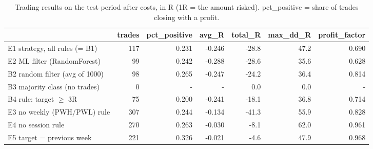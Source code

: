 \begin{table}[h]
\centering
\caption{Trading results on the test period after costs, in R (1R = the amount risked). pct\_positive = share of trades closing with a profit.}
\label{tab:table3_trading}
\small
\begin{tabular}{lrrrrrr}
\hline
 & trades & pct\_positive & avg\_R & total\_R & max\_dd\_R & profit\_factor \\
\hline
E1 strategy, all rules (= B1) & 117 & 0.231 & -0.246 & -28.8 & 47.2 & 0.690 \\
E2 ML filter (RandomForest) & 99 & 0.242 & -0.288 & -28.6 & 35.6 & 0.628 \\
B2 random filter (avg of 1000) & 98 & 0.265 & -0.247 & -24.2 & 36.4 & 0.814 \\
B3 majority class (no trades) & 0 & - & - & 0.0 & 0.0 & - \\
B4 rule: target $\geq$ 3R & 75 & 0.200 & -0.241 & -18.1 & 36.8 & 0.714 \\
E3 no weekly (PWH/PWL) rule & 307 & 0.244 & -0.134 & -41.3 & 55.9 & 0.828 \\
E4 no session rule & 270 & 0.263 & -0.030 & -8.1 & 62.0 & 0.961 \\
E5 target = previous week & 221 & 0.326 & -0.021 & -4.6 & 47.9 & 0.968 \\
\hline
\end{tabular}
\end{table}